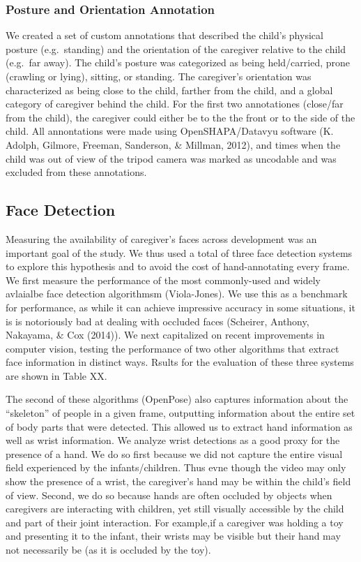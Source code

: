 \documentclass[10pt, letterpaper]{article}
\begin{document}
\subsubsection{Posture and Orientation
Annotation}\label{posture-and-orientation-annotation}

We created a set of custom annotations that described the child's
physical posture (e.g.~standing) and the orientation of the caregiver
relative to the child (e.g.~far away). The child's posture was
categorized as being held/carried, prone (crawling or lying), sitting,
or standing. The caregiver's orientation was characterized as being
close to the child, farther from the child, and a global category of
caregiver behind the child. For the first two annotationes (close/far
from the child), the caregiver could either be to the the front or to
the side of the child. All annontations were made using
OpenSHAPA/Datavyu software (K. Adolph, Gilmore, Freeman, Sanderson, \&
Millman, 2012), and times when the child was out of view of the tripod
camera was marked as uncodable and was excluded from these annotations.

\subsection{Face Detection}\label{face-detection}

Measuring the availability of caregiver's faces across development was
an important goal of the study. We thus used a total of three face
detection systems to explore this hypothesis and to avoid the cost of
hand-annotating every frame. We first measure the performance of the
most commonly-used and widely avlaialbe face detection algorithmsm
(Viola-Jones). We use this as a benchmark for performance, as while it
can achieve impressive accuracy in some situations, it is is notoriously
bad at dealing with occluded faces (Scheirer, Anthony, Nakayama, \& Cox
(2014)). We next capitalized on recent improvements in computer vision,
testing the performance of two other algorithms that extract face
information in distinct ways. Rsults for the evaluation of these three
systems are shown in Table XX.

The second of these algorithms (OpenPose) also captures information
about the ``skeleton'' of people in a given frame, outputting
information about the entire set of body parts that were detected. This
allowed us to extract hand information as well as wrist information. We
analyze wrist detections as a good proxy for the presence of a hand. We
do so first because we did not capture the entire visual field
experienced by the infants/children. Thus evne though the video may only
show the presence of a wrist, the caregiver's hand may be within the
child's field of view. Second, we do so because hands are often occluded
by objects when caregivers are interacting with children, yet still
visually accessible by the child and part of their joint interaction.
For example,if a caregiver was holding a toy and presenting it to the
infant, their wrists may be visible but their hand may not necessarily
be (as it is occluded by the toy).
\end{document}
